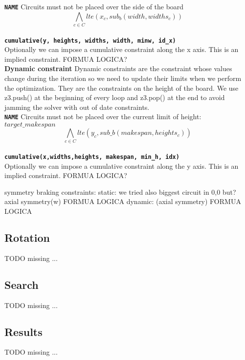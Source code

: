 \texttt\textbf{NAME} Circuits must not be placed over the side of the board\\
\begin{equation}
    \bigwedge\limits_{c \in C} lte(x_c, sub_b(width, widths_c))
\end{equation}\\

\texttt\textbf{cumulative(y, heights, widths, width, minw, id\_x) }\\ 
Optionally we can impose a cumulative constraint along the x axis. This is an implied
 constraint. FORMUA LOGICA?\\

\textbf{Dynamic constraint}
Dynamic constraints are the constraint whose values change during the iteration so we
need to update their limits when we perform the optimization. They are the constraints 
on the height of the board. We use z3.push() at the beginning of every loop and z3.pop()
 at the end to avoid jamming the solver with out of date constraints.\\

\texttt\textbf{NAME} Circuits must not be placed over the current limit of height: 
$target\_makespan$ \\
\begin{equation}
    \bigwedge\limits_{c \in C} lte(y_c, sub\_b(makespan, heights_c))
\end{equation}\\

\texttt\textbf{cumulative(x,widths,heights, makespan, min\_h, idx)} \\
Optionally we can impose a cumulative constraint along the y axis. This is an implied
constraint. FORMUA LOGICA?

symmetry braking constraints: 
static: 
     we tried also biggest circuit in 0,0 but?
    axial symmetry(w) FORMUA LOGICA
dynamic: (axial symmetry) FORMUA LOGICA



\subsection{Rotation}
    \colorbox{BurntOrange}{TODO missing ...}


\subsection{Search}
    \colorbox{BurntOrange}{TODO missing ...}


\subsection{Results}
    \colorbox{BurntOrange}{TODO missing ...}
